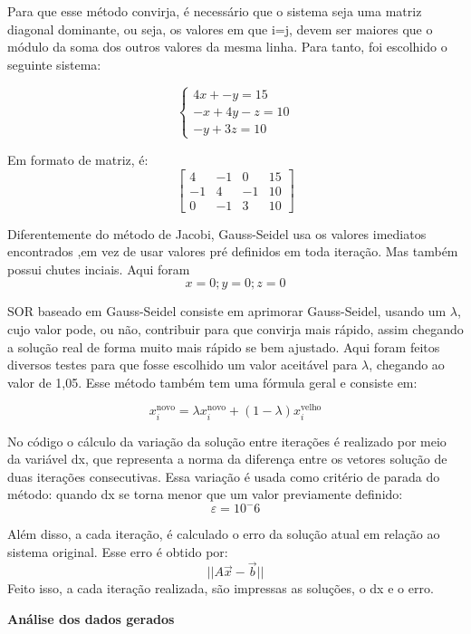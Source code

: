 \documentclass[12pt,a4paper,openany,oneside]{abntex2}
\begin{document}
Para que esse método convirja, é necessário que o sistema seja
uma matriz diagonal dominante, ou seja, os valores em que i=j, devem ser maiores que o módulo da soma dos outros valores da mesma linha. Para tanto, foi escolhido o seguinte sistema:

\begin{equation}
\begin{cases}
4x + -y = 15 \\
-x + 4y -z = 10 \\
-y+3z = 10
\end{cases}
\nonumber
\end{equation}

Em formato de matriz, é:
\[
\left[
\begin{array}{ccc|c}
4 & -1 & 0 & 15 \\
-1 & 4 & -1 & 10 \\
0 & -1 & 3 & 10
\end{array}
\right]
\]

Diferentemente do método de Jacobi, Gauss-Seidel usa os valores imediatos encontrados
,em vez de usar valores pré definidos em toda iteração. Mas também possui chutes inciais. Aqui foram
\begin{equation} 
x=0; y=0; z=0 
\nonumber
\end{equation}

SOR baseado em Gauss-Seidel consiste em aprimorar Gauss-Seidel, usando um $\lambda$, cujo valor pode, ou não,
contribuir para que convirja mais rápido, assim chegando a solução real de forma muito mais rápido se bem ajustado.
Aqui foram feitos diversos testes para que fosse escolhido um valor aceitável para $\lambda$, chegando ao valor de 1,05.
Esse método também tem uma fórmula geral e consiste em:

\begin{equation}
    x_{\!i}^{\text{novo}} = \lambda x_{\!i}^{\text{novo}} + (1 - \lambda) x_{\!i}^{\text{velho}}
\nonumber
\end{equation}

No código o cálculo da variação da solução entre iterações é realizado por meio da variável dx, que representa a norma 
da diferença entre os vetores solução de duas iterações consecutivas. Essa variação é usada como critério de parada 
do método: quando dx se torna menor que um valor previamente definido:
\begin{equation} \varepsilon=10^-6
    \nonumber
\end{equation}

Além disso, a cada iteração, é calculado o erro da solução atual em relação ao sistema original. Esse erro é obtido por:
\begin{equation}
    ||A\vec{x}-\vec{b}||
    \nonumber
\end{equation}
Feito isso, a cada iteração realizada, são impressas as soluções, o dx e o erro.
\\
\begin{center}
    \textbf{\large Análise dos dados gerados}
\end{center}
\end{document}
